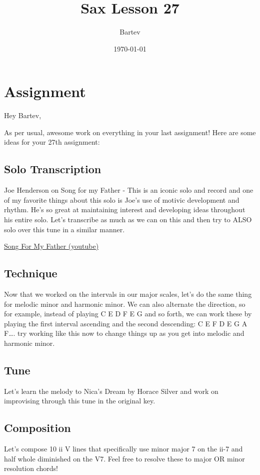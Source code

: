 \documentclass[11pt]{article}
\author{Bartev}
\date{\today}
\title{Sax Lesson 27}
\let\maketitle\relax %
\begin{document}
\maketitle
\tableofcontents


\section{Assignment}
\label{sec:org4399734}

Hey Bartev,

As per usual, awesome work on everything in your last assignment! Here are some ideas for your 27th assignment:

\subsection{Solo Transcription}
\label{sec:org988ebc0}
Joe Henderson on Song for my Father - This is an iconic solo and record and one of my favorite things about this solo is Joe's use of motivic development and rhythm. He's so great at maintaining interest and developing ideas throughout his entire solo. Let's transcribe as much as we can on this and then try to ALSO solo over this tune in a similar manner.

\href{https://www.youtube.com/watch?v=CWeXOm49kE0}{Song For My Father (youtube)}

\subsection{Technique}
\label{sec:org5566f3d}
Now that we worked on the intervals in our major scales, let's do the same thing for melodic minor and harmonic minor. We can also alternate the direction, so for example, instead of playing C E D F E G and so forth, we can work these by playing the first interval ascending and the second descending: C E F D E G A F\ldots{}. try working like this now to change things up as you get into melodic and harmonic minor.


\subsection{Tune}
\label{sec:orgccfa03b}
Let's learn the melody to Nica's Dream by Horace Silver and work on improvising through this tune in the original key.

\subsection{Composition}
\label{sec:org14cf9f8}
Let's compose 10 ii V lines that specifically use minor major 7 on the ii-7 and half whole diminished on the V7. Feel free to resolve these to major OR minor resolution chords!
\end{document}
